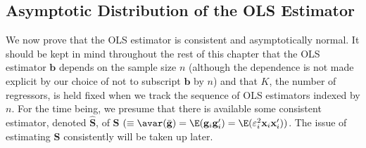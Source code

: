 \subsection*{Asymptotic Distribution of the OLS Estimator}

We now prove that the OLS estimator is consistent and asymptotically normal.  It
should be kept in mind throughout the rest of this chapter that the OLS estimator
$\mathbf{b}$ depends on the sample size $n$ (although the dependence is not made
explicit by our choice of not to subscript $\mathbf{b}$ by $n$) and that $K$, the
number of regressors, is held fixed when we track the sequence of OLS estimators
indexed by $n$.  For the time being, we presume that there is available some
consistent estimator, denoted $\widehat{\mathbf{S}}$, of
$\mathbf{S}$ $(\equiv \avar(\bar{\mathbf{g}}) = \E(\mathbf{g}_i\mathbf{g}_i')
= \E(\varepsilon_i^2\mathbf{x}_i\mathbf{x}_i'))$.  The issue of estimating
$\mathbf{S}$ consistently will be taken up later.

